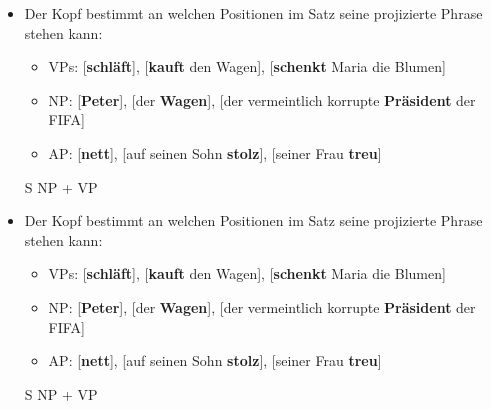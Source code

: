 \begin{frame}

\begin{itemize}
	\item Der Kopf bestimmt an welchen Positionen im Satz seine projizierte Phrase stehen kann:
	\begin{itemize}
		\item VPs: [\textbf{schläft}], [\textbf{kauft} den Wagen], [\textbf{schenkt} Maria die Blumen]
		\item NP: [\textbf{Peter}], [der \textbf{Wagen}], [der vermeintlich korrupte \textbf{Präsident} der FIFA]
		\item AP: [\textbf{nett}], [auf seinen Sohn \textbf{stolz}], [seiner Frau \textbf{treu}]
\end{itemize}
	\pause

\eal S \ras NP + VP
\zl
	
	
\end{itemize}

\end{frame}


\begin{frame}

\begin{itemize}
	\item Der Kopf bestimmt an welchen Positionen im Satz seine projizierte Phrase stehen kann:
	\begin{itemize}
		\item VPs: [\textbf{schläft}], [\textbf{kauft} den Wagen], [\textbf{schenkt} Maria die Blumen]
		\item NP: [\textbf{Peter}], [der \textbf{Wagen}], [der vermeintlich korrupte \textbf{Präsident} der FIFA]
		\item AP: [\textbf{nett}], [auf seinen Sohn \textbf{stolz}], [seiner Frau \textbf{treu}]
\end{itemize}
	\pause

\eal S \ras NP + VP
\zl
	
	
\end{itemize}

\end{frame}


